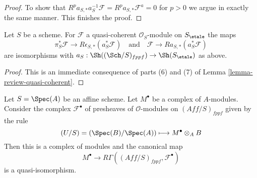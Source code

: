 \begin{proof}
\medskip\noindent
To show that $R^pa_{S, *}a_S^{-1}\mathcal{F} = R^pa_{S, *}\mathcal{F}^a = 0$
for $p > 0$ we argue in exactly the same manner. This finishes the proof.
\end{proof}

\begin{lemma}
\label{lemma-cohomological-descent-etale-fppf-modules}
Let $S$ be a scheme. For $\mathcal{F}$ a quasi-coherent
$\mathcal{O}_S$-module on $S_\etale$ the maps
$$
\pi_S^*\mathcal{F} \longrightarrow R\epsilon_{S, *}(a_S^*\mathcal{F})
\quad\text{and}\quad
\mathcal{F} \longrightarrow Ra_{S, *}(a_S^*\mathcal{F})
$$
are isomorphisms with
$a_S : \Sh((\Sch/S)_{fppf}) \to \Sh(S_\etale)$ as above.
\end{lemma}

\begin{proof}
This is an immediate consequence of
parts (6) and (7) of
Lemma \ref{lemma-review-quasi-coherent}.
\end{proof}

\begin{lemma}
\label{lemma-cohomological-descent-complex-modules}
Let $S = \Spec(A)$ be an affine scheme. Let $M^\bullet$ be a complex
of $A$-modules. Consider the complex $\mathcal{F}^\bullet$ of
presheaves of $\mathcal{O}$-modules on
$(\textit{Aff}/S)_{fppf}$ given by the rule
$$
(U/S) = (\Spec(B)/\Spec(A)) \longmapsto M^\bullet \otimes_A B
$$
Then this is a complex of modules and the canonical map
$$
M^\bullet \longrightarrow
R\Gamma((\textit{Aff}/S)_{fppf}, \mathcal{F}^\bullet)
$$
is a quasi-isomorphism.
\end{lemma}

